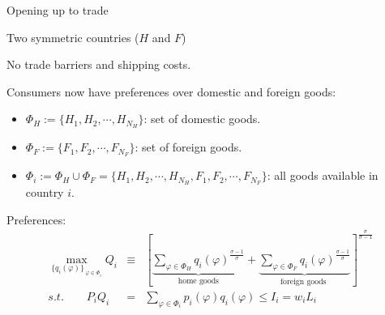 \documentclass[notes,11pt, aspectratio=169, xcolor=table]{beamer}
\newenvironment{wideitemize}{\itemize\addtolength{\itemsep}{10pt}}{\enditemize}
\begin{document}
\begin{frame}{Opening up to trade}
\begin{wideitemize}
    \item Two symmetric countries ($H$ and $F$)
    \item No trade barriers and shipping costs.
    \item<2-> Consumers now have preferences over domestic and foreign goods:
    \begin{itemize}
        \item $\Phi_H := \{ H_1, H_2, \cdots,H_{N_H} \}$: set of domestic goods.
        \item $\Phi_F := \{ F_1, F_2, \cdots,F_{N_F} \}$: set of foreign goods.
        \item $\Phi_i := \Phi_H \cup \Phi_F = \{ H_1, H_2, \cdots,H_{N_H}, F_1, F_2, \cdots,F_{N_F} \}$: all goods available in country $i$.
    \end{itemize}

    \item<3-> Preferences:
    \begin{eqnarray*}
        \max_{\{q_i(
    \varphi)\}_{\
    \varphi \in \Phi_i}} Q_i &\equiv& \left[ \underbrace{\sum_{\varphi \in \Phi_H } q_i(
    \varphi)^{\tfrac{\sigma-1}{\sigma}}}_{\text{home goods}} + \underbrace{\sum_{\varphi \in \Phi_F } q_i(
    \varphi)^{\tfrac{\sigma-1}{\sigma}}}_{\text{foreign goods }} \right]^{\tfrac{\sigma}{\sigma-1} } \\
    s.t. \qquad  P_i Q_i &=&\sum_{\varphi \in \Phi_i } p_i(\varphi) q_i(\varphi) \le I_i = w_i L_i 
\end{eqnarray*}
 

\end{wideitemize}
\end{frame}
\end{document}
